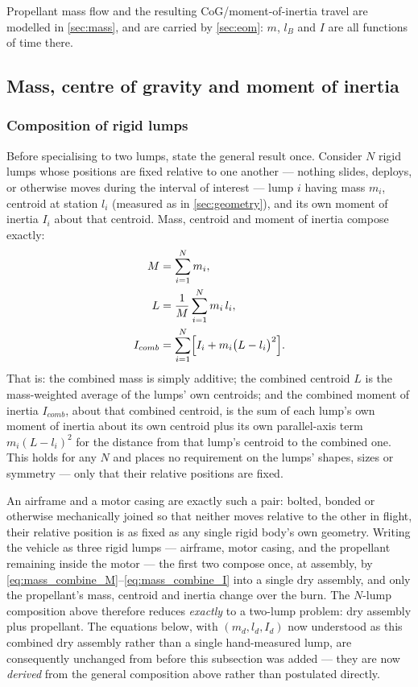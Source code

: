 Propellant mass flow and the resulting CoG/moment-of-inertia travel are modelled in
\autoref{sec:mass}, and are carried by \autoref{sec:eom}: $m$, $l_B$ and $I$ are all functions of
time there.

\subsection{Mass, centre of gravity and moment of inertia}\label{sec:mass}

\subsubsection{Composition of rigid lumps}\label{sec:mass_composition}
Before specialising to two lumps, state the general result once. Consider $N$ rigid lumps whose
positions are fixed relative to one another --- nothing slides, deploys, or otherwise moves during
the interval of interest --- lump $i$ having mass $m_i$, centroid at station $l_i$ (measured as in
\autoref{sec:geometry}), and its own moment of inertia $I_i$ about that centroid. Mass, centroid and
moment of inertia compose exactly:
\begin{align}
    M &= \sum_{i=1}^{N} m_i, \label{eq:mass_combine_M}\\
    L &= \frac{1}{M}\sum_{i=1}^{N} m_i\,l_i, \label{eq:mass_combine_L}\\
    I_{comb} &= \sum_{i=1}^{N} \Bigl[I_i + m_i\bigl(L-l_i\bigr)^2\Bigr]. \label{eq:mass_combine_I}
\end{align}
That is: the combined mass is simply additive; the combined centroid $L$ is the mass-weighted
average of the lumps' own centroids; and the combined moment of inertia $I_{comb}$, about that
combined centroid, is the sum of each lump's own moment of inertia about its own centroid plus its
own parallel-axis term $m_i(L-l_i)^2$ for the distance from that lump's centroid to the combined
one. This holds for any $N$ and places no requirement on the lumps' shapes, sizes or symmetry ---
only that their relative positions are fixed.

An airframe and a motor casing are exactly such a pair: bolted, bonded or otherwise mechanically
joined so that neither moves relative to the other in flight, their relative position is as fixed
as any single rigid body's own geometry. Writing the vehicle as three rigid lumps --- airframe,
motor casing, and the propellant remaining inside the motor --- the first two compose once, at
assembly, by \eqref{eq:mass_combine_M}--\eqref{eq:mass_combine_I} into a single dry assembly, and
only the propellant's mass, centroid and inertia change over the burn. The $N$-lump composition
above therefore reduces \emph{exactly} to a two-lump problem: dry assembly plus propellant. The
equations below, with $(m_d,l_d,I_d)$ now understood as this combined dry assembly rather than a
single hand-measured lump, are consequently unchanged from before this subsection was added ---
they are now \emph{derived} from the general composition above rather than postulated directly.

